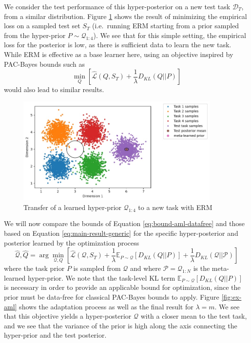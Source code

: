 \documentclass{article}
\theoremstyle{definition}
\newcommand{\Expect}[2]{\mathbb{E}_{#1}\left [#2 \right ]}
\begin{document}
We consider the test performance of this hyper-posterior on a new test task $\mathcal{D}_T$, from a similar distribution.
 Figure \ref{fig:ex-erm} shows the result of minimizing the empirical loss on a sampled test set $S_T$ (i.e.\ running ERM starting from a prior sampled from the hyper-prior $P\sim \mathcal{Q}_{1:4}$). We see that for this simple setting, the empirical loss for the posterior is low, as there is sufficient data to learn the new task.
While ERM is effective as a base learner here, using an objective inspired by PAC-Bayes bounds such as $$\min_{Q}\left [\hat{\mathcal{L}}(Q, S_T) + \frac{1}{\lambda}D_{KL}(Q||P)\right ]$$ would also lead to similar results. 

\begin{figure}
	\centering
	\includegraphics[width=0.9\textwidth]{toy_example_erm.JPG}
	\caption{Transfer of a learned hyper-prior $\mathcal{Q}_{1:4}$ to a new task with ERM}
	\label{fig:ex-erm}
\end{figure}

We will now compare the bounds of Equation \ref{eq:bound-aml-datafree} and those based on Equation \ref{eq:main-result-generic} for the specific hyper-posterior and posterior learned by the optimization process
$$\hat{\mathcal{Q}},\hat{Q}=\arg\min_{\mathcal{Q},Q}\left [\hat{\mathcal{L}}(\mathcal{Q}, S_T) + \frac{1}{\lambda}\Expect{P\sim \mathcal{Q}}{D_{KL}(Q||P)}+\frac{1}{\lambda}D_{KL}(\mathcal{Q}||\mathcal{P})\right ]$$
where the task prior $P$ is sampled from $\mathcal{Q}$ and where $\mathcal{P}=\mathcal{Q}_{1:N}$ is the meta-learned hyper-prior. 
We note that the task-level KL term $\Expect{P\sim \mathcal{Q}}{D_{KL}(Q||P)}$ is necessary in order to provide an applicable bound for optimization, since the prior must be data-free for classical PAC-Bayes bounds to apply. 
Figure \ref{fig:ex-aml} shows the adaptation process as well as the final result for $\lambda=m$. We see that this objective yields a hyper-posterior $\mathcal{Q}$ with a closer mean to the test task, and we see that the variance of the prior is high along the axis connecting the hyper-prior and the test posterior.
\end{document}
